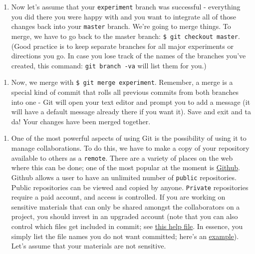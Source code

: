 \documentclass[english,]{book}
\providecommand{\tightlist}{%
  \setlength{\itemsep}{0pt}\setlength{\parskip}{0pt}}
\begin{document}
\begin{enumerate}
\def\labelenumi{\arabic{enumi}.}
\setcounter{enumi}{3}
\tightlist
\item
  Now let's assume that your \texttt{experiment} branch was successful -
  everything you did there you were happy with and you want to integrate
  all of those changes back into your \texttt{master} branch. We're
  going to merge things. To merge, we have to go back to the master
  branch: \texttt{\$\ git\ checkout\ master}. (Good practice is to keep
  separate branches for all major experiments or directions you go. In
  case you lose track of the names of the branches you've created, this
  command: \texttt{git\ branch\ -va} will list them for you.)
\end{enumerate}

\begin{enumerate}
\def\labelenumi{\alph{enumi}.}
\tightlist
\item
  Now, we merge with \texttt{\$\ git\ merge\ experiment}. Remember, a
  merge is a special kind of commit that rolls all previous commits from
  both branches into one - Git will open your text editor and prompt you
  to add a message (it will have a default message already there if you
  want it). Save and exit and ta da! Your changes have been merged
  together.
\end{enumerate}

\begin{enumerate}
\def\labelenumi{\arabic{enumi}.}
\setcounter{enumi}{4}
\tightlist
\item
  One of the most powerful aspects of using Git is the possibility of
  using it to manage collaborations. To do this, we have to make a copy
  of your repository available to others as a \texttt{remote}. There are
  a variety of places on the web where this can be done; one of the most
  popular at the moment is \href{http://github.com}{Github}. Github
  allows a user to have an unlimited number of \texttt{public}
  repositories. Public repositories can be viewed and copied by anyone.
  \texttt{Private} repositories require a paid account, and access is
  controlled. If you are working on sensitive materials that can only be
  shared amongst the collaborators on a project, you should invest in an
  upgraded account (note that you can also control which files get
  included in commit; see
  \href{https://help.github.com/articles/ignoring-files/}{this help
  file}. In essence, you simply list the file names you do not want
  committed; here's an
  \href{https://gist.github.com/octocat/9257657}{example}). Let's assume
  that your materials are not sensitive.
\end{enumerate}
\end{document}
